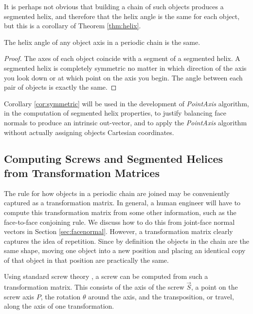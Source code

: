 \documentclass[mathematics,article,submit,pdftex,moreauthors]{Definitions/mdpi}
\begin{document}
It is perhaps not obvious that building a chain of such objects
produces a segmented helix, and therefore that the helix angle is the
same for each object, but this is a corollary of Theorem \ref{thm:helix}.


\begin{Corollary}
  The helix angle of any object axis in a periodic chain is the same.
  \label{cor:symmetric}
\end{Corollary}

\begin{proof}
  The axes of each object coincide with a segment of a segmented helix.
  A segmented helix is completely symmetric no matter in which direction
  of the axis you look down or at which point on the axis you begin. The angle between each pair of objects
  is exactly the same.
\end{proof}

Corollary \ref{cor:symmetric} will be used in the development of {\em PointAxis} algorithm,
in the computation of segmented helix properties, to justify balancing face normals
to produce an intrinsic out-vector, and to apply the {\em PointAxis} algorithm
without actually assigning objects Cartesian coordinates.

\subsection{Computing Screws and Segmented Helices from Transformation Matrices}
\label{sec:screws}

The rule for how objects in a periodic chain are joined may be
conveniently captured as a transformation
matrix.
In general, a human engineer will have to compute this transformation matrix from some other
information, such as the face-to-face conjoining rule.
We discuss how to do this from joint-face normal
vectors in Section \ref{sec:facenormal}. However, a transformation matrix clearly
captures the idea of repetition.
Since by definition the objects in the chain are the same shape,
moving one object into a new position and placing an identical copy of that object in that position
are practically the same.

Using standard screw theory \cite{wittenburg2016kinematics,wiki:screwaxis},
a screw can be computed from such
a transformation matrix. This consists of the axis of the screw $\overrightarrow{S}$,
a point on the screw axis $P$,
the rotation $\theta$ around the axis, and the
transposition, or travel, along the axis of one transformation.
\end{document}
